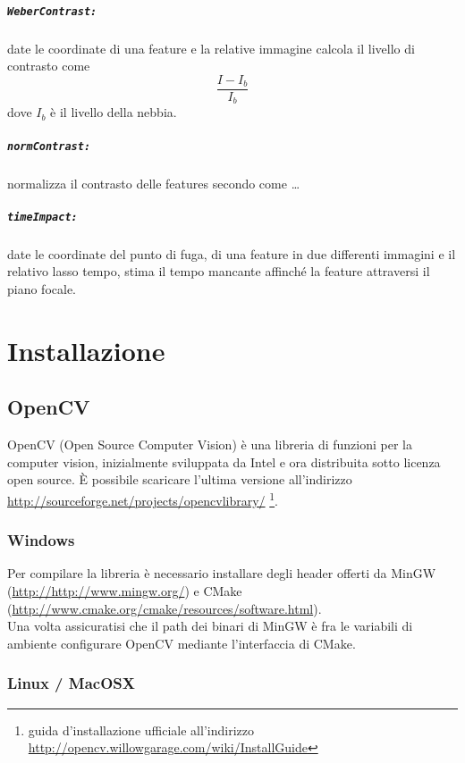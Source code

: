 \documentclass[12pt]{report}
\begin{document}
\paragraph*{\verb_WeberContrast:_} date le coordinate di una feature e la relative immagine calcola il livello di contrasto come $$\frac{I-I_b}{I_b}$$ dove $I_b$ \`e il livello della nebbia.

\paragraph*{\verb_normContrast:_} normalizza il contrasto delle features secondo come \dots

\paragraph*{\verb_timeImpact:_} date le coordinate del punto di fuga, di una feature in due differenti immagini e il relativo lasso tempo, stima il tempo mancante affinch\'e la feature attraversi il piano focale. %

\chapter{Installazione}
\section{OpenCV}
OpenCV (Open Source Computer Vision) \`e una libreria di funzioni per la computer vision, inizialmente sviluppata da Intel e ora distribuita sotto licenza open source. \`E possibile scaricare l'ultima versione all'indirizzo \url{http://sourceforge.net/projects/opencvlibrary/} \footnote{guida d'installazione ufficiale all'indirizzo \url{http://opencv.willowgarage.com/wiki/InstallGuide}}.

\subsection{Windows}
Per compilare la libreria \`e necessario installare degli header offerti da MinGW (\url{http://http://www.mingw.org/}) e CMake (\url{http://www.cmake.org/cmake/resources/software.html}).\\
\noindent Una volta assicuratisi che il path dei binari di MinGW \`e fra le variabili di ambiente configurare OpenCV mediante l'interfaccia di CMake.

\subsection{Linux / MacOSX}
\end{document}
